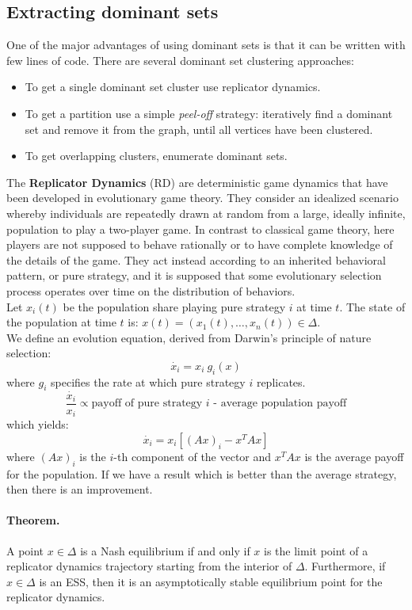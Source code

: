 \subsection{Extracting dominant sets}
One of the major advantages of using dominant sets is that it can be written with few lines of code. There are several dominant set clustering approaches:
\begin{itemize}
	\item To get a single dominant set cluster use replicator dynamics.
	\item To get a partition use a simple \textit{peel-off} strategy: iteratively find a dominant set and remove it from the graph, until all vertices have been clustered.
	\item To get overlapping clusters, enumerate dominant sets. 
\end{itemize}
The \textbf{Replicator Dynamics} (RD) are deterministic game dynamics that have been developed in evolutionary game theory. They consider an idealized scenario whereby individuals are repeatedly drawn at random from a large, ideally infinite, population to play a two-player game. In contrast to classical game theory, here players are not supposed to behave rationally or to have complete knowledge of the details of the game. They act instead according to an inherited behavioral pattern, or pure strategy, and it is supposed that some evolutionary selection process operates over time on the distribution of behaviors.\\
Let $x_i(t)$ be the population share playing pure strategy $i$ at time $t$. The state of the population at time $t$ is: $x(t) = (x_1(t),\dots,x_n(t))\in\Delta$.\\
We define an evolution equation, derived from Darwin's principle of nature selection:
$$\dot{x_i} = x_i~g_i(x)$$
where $g_i$ specifies the rate at which pure strategy $i$ replicates.
$$\frac{\dot{x_i}}{x_i} \propto \text{payoff of pure strategy }i\text{ - average population payoff}$$
which yields:
$$\dot{x_i} = x_i[(Ax)_i - x^TAx]$$
where $(Ax)_i$ is the $i$-th component of the vector and $x^TAx$ is the average payoff for the population. If we have a result which is better than the average strategy, then there is an improvement.

\paragraph{Theorem.} A point $x\in\Delta$ is a Nash equilibrium if and only if $x$ is the limit point of a replicator dynamics trajectory starting from the interior of $\Delta$.
Furthermore, if $x\in\Delta$ is an ESS, then it is an asymptotically stable equilibrium point for the replicator dynamics.\\

